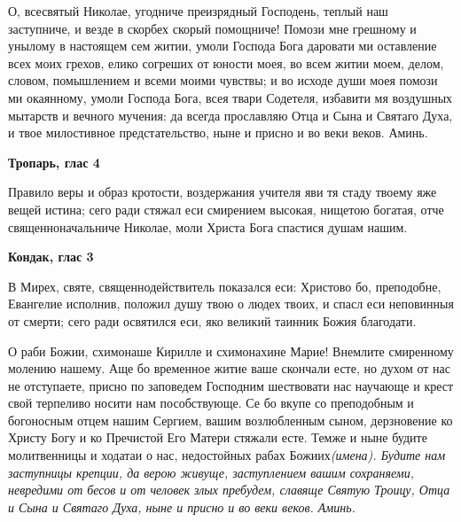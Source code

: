 

\label{_content_svyatim-oputeshestvuyuchih}

 

 

О, всесвятый Николае, угодниче преизрядный Господень, теплый наш заступниче, и везде в скорбех скорый помощниче! Помози мне грешному и унылому в настоящем сем житии, умоли Господа Бога даровати ми оставление всех моих грехов, елико согреших от юности моея, во всем житии моем, делом, словом, помышлением и всеми моими чувствы; и во исходе души моея помози ми окаянному, умоли Господа Бога, всея твари Содетеля, избавити мя воздушных мытарств и вечного мучения: да всегда прославляю Отца и Сына и Святаго Духа, и твое милостивное предстательство, ныне и присно и во веки веков. Аминь.


\medskip


\bfseries Тропарь, глас 4\normalfont{}\nopagebreak


Правило веры и образ кротости, воздержания учителя яви тя стаду твоему яже вещей истина; сего ради стяжал еси смирением высокая, нищетою богатая, отче священноначальниче Николае, моли Христа Бога спастися душам нашим.


\medskip


\bfseries Кондак, глас 3\normalfont{}\nopagebreak


В Мирех, святе, священнодействитель показался еси: Христово бо, преподобне, Евангелие исполнив, положил душу твою о людех твоих, и спасл еси неповинныя от смерти; сего ради освятился еси, яко великий таинник Божия благодати. 
\mychapterending

 


О раби Божии, схимонаше Кирилле и схимонахине Марие! Внемлите смиренному молению нашему. Аще бо временное житие ваше скончали есте, но духом от нас не отступаете, присно по заповедем Господним шествовати нас научающе и крест свой терпеливо носити нам пособствующе. Се бо вкупе со преподобным и богоносным отцем нашим Сергием, вашим возлюбленным сыном, дерзновение ко Христу Богу и ко Пречистой Его Матери стяжали есте. Темже и ныне будите молитвенницы и ходатаи о нас, недостойных рабах Божиих\itshape  (имена)\normalfont{}. Будите нам заступницы крепции, да верою живуще, заступлением вашим сохраняеми, невредими от бесов и от человек злых пребудем, славяще Святую Троицу, Отца и Сына и Святаго Духа, ныне и присно и во веки веков. Аминь. 
\mychapterending

